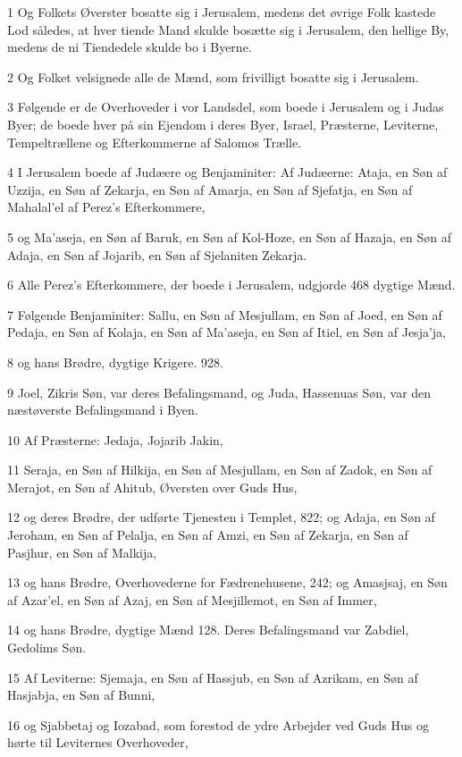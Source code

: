 \par 1 Og Folkets Øverster bosatte sig i Jerusalem, medens det øvrige Folk kastede Lod således, at hver tiende Mand skulde bosætte sig i Jerusalem, den hellige By, medens de ni Tiendedele skulde bo i Byerne.
\par 2 Og Folket velsignede alle de Mænd, som frivilligt bosatte sig i Jerusalem.
\par 3 Følgende er de Overhoveder i vor Landsdel, som boede i Jerusalem og i Judas Byer; de boede hver på sin Ejendom i deres Byer, Israel, Præsterne, Leviterne, Tempeltrællene og Efterkommerne af Salomos Trælle.
\par 4 I Jerusalem boede af Judæere og Benjaminiter: Af Judæerne: Ataja, en Søn af Uzzija, en Søn af Zekarja, en Søn af Amarja, en Søn af Sjefatja, en Søn af Mahalal'el af Perez's Efterkommere,
\par 5 og Ma'aseja, en Søn af Baruk, en Søn af Kol-Hoze, en Søn af Hazaja, en Søn af Adaja, en Søn af Jojarib, en Søn af Sjelaniten Zekarja.
\par 6 Alle Perez's Efterkommere, der boede i Jerusalem, udgjorde 468 dygtige Mænd.
\par 7 Følgende Benjaminiter: Sallu, en Søn af Mesjullam, en Søn af Joed, en Søn af Pedaja, en Søn af Kolaja, en Søn af Ma'aseja, en Søn af Itiel, en Søn af Jesja'ja,
\par 8 og hans Brødre, dygtige Krigere. 928.
\par 9 Joel, Zikris Søn, var deres Befalingsmand, og Juda, Hassenuas Søn, var den næstøverste Befalingsmand i Byen.
\par 10 Af Præsterne: Jedaja, Jojarib Jakin,
\par 11 Seraja, en Søn af Hilkija, en Søn af Mesjullam, en Søn af Zadok, en Søn af Merajot, en Søn af Ahitub, Øversten over Guds Hus,
\par 12 og deres Brødre, der udførte Tjenesten i Templet, 822; og Adaja, en Søn af Jeroham, en Søn af Pelalja, en Søn af Amzi, en Søn af Zekarja, en Søn af Pasjhur, en Søn af Malkija,
\par 13 og hans Brødre, Overhovederne for Fædrenehusene, 242; og Amasjsaj, en Søn af Azar'el, en Søn af Azaj, en Søn af Mesjillemot, en Søn af Immer,
\par 14 og hans Brødre, dygtige Mænd 128. Deres Befalingsmand var Zabdiel, Gedolims Søn.
\par 15 Af Leviterne: Sjemaja, en Søn af Hassjub, en Søn af Azrikam, en Søn af Hasjabja, en Søn af Bunni,
\par 16 og Sjabbetaj og Iozabad, som forestod de ydre Arbejder ved Guds Hus og hørte til Leviternes Overhoveder,
